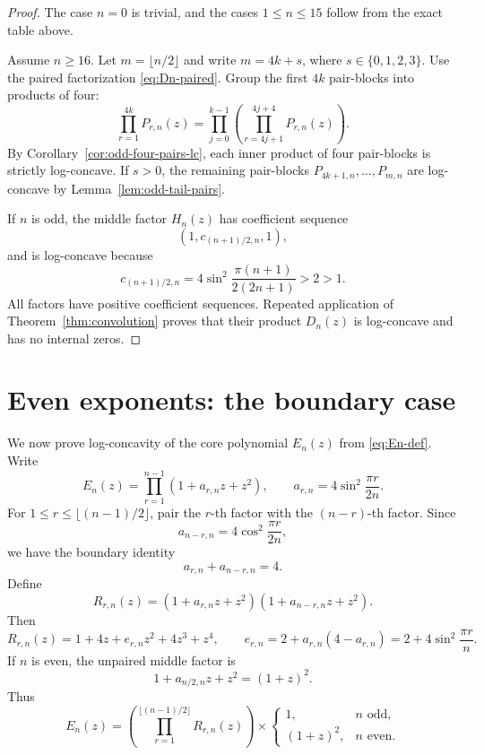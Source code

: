\documentclass[11pt]{amsart}
\begin{document}
\begin{proof}
The case \(n=0\) is trivial, and the cases \(1\le n\le15\) follow from the exact table above.

Assume \(n\ge16\).  Let \(m=\lfloor n/2\rfloor\) and write \(m=4k+s\), where \(s\in\{0,1,2,3\}\).  Use the paired factorization \eqref{eq:Dn-paired}.  Group the first \(4k\) pair-blocks into products of four:
\[
        \prod_{r=1}^{4k}P_{r,n}(z)
        =\prod_{j=0}^{k-1}
        \left(\prod_{r=4j+1}^{4j+4}P_{r,n}(z)\right).
\]
By Corollary~\ref{cor:odd-four-pairs-lc}, each inner product of four pair-blocks is strictly log-concave.  If \(s>0\), the remaining pair-blocks \(P_{4k+1,n},\ldots,P_{m,n}\) are log-concave by Lemma~\ref{lem:odd-tail-pairs}.

If \(n\) is odd, the middle factor \(H_n(z)\) has coefficient sequence
\[
        \left(1,c_{(n+1)/2,n},1\right),
\]
and is log-concave because
\[
        c_{(n+1)/2,n}=4\sin^2\frac{\pi(n+1)}{2(2n+1)}>2>1.
\]
All factors have positive coefficient sequences.  Repeated application of Theorem~\ref{thm:convolution} proves that their product \(D_n(z)\) is log-concave and has no internal zeros.
\end{proof}

\section{Even exponents: the boundary case}\label{sec:even}

We now prove log-concavity of the core polynomial \(E_n(z)\) from \eqref{eq:En-def}.  Write
\[
        E_n(z)=\prod_{r=1}^{n-1}(1+a_{r,n}z+z^2),
        \qquad
        a_{r,n}=4\sin^2\frac{\pi r}{2n}.
\]
For \(1\le r\le \lfloor(n-1)/2\rfloor\), pair the \(r\)-th factor with the \((n-r)\)-th factor.  Since
\[
        a_{n-r,n}=4\cos^2\frac{\pi r}{2n},
\]
we have the boundary identity
\begin{equation}\label{eq:even-pair-sum}
        a_{r,n}+a_{n-r,n}=4.
\end{equation}
Define
\[
        R_{r,n}(z)=(1+a_{r,n}z+z^2)(1+a_{n-r,n}z+z^2).
\]
Then
\begin{equation}\label{eq:Rrn-form}
        R_{r,n}(z)=1+4z+e_{r,n}z^2+4z^3+z^4,
        \qquad
        e_{r,n}=2+a_{r,n}(4-a_{r,n})=2+4\sin^2\frac{\pi r}{n}.
\end{equation}
If \(n\) is even, the unpaired middle factor is
\[
        1+a_{n/2,n}z+z^2=(1+z)^2.
\]
Thus
\begin{equation}\label{eq:En-paired}
        E_n(z)=
        \left(\prod_{r=1}^{\lfloor(n-1)/2\rfloor}R_{r,n}(z)\right)
        \times
        \begin{cases}
        1, & n\text{ odd},\\
        (1+z)^2, & n\text{ even}.
        \end{cases}
\end{equation}
\end{document}
